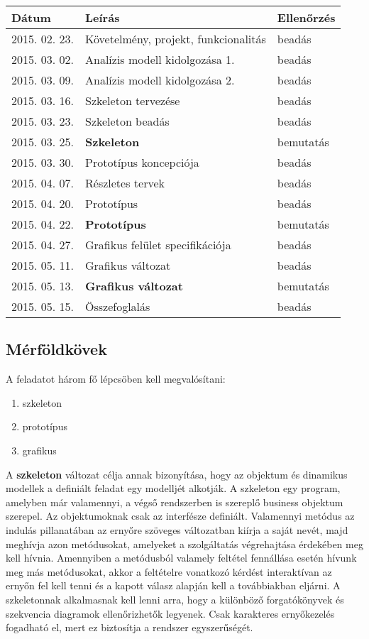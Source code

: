 \begin{tabularx}{\linewidth}{| l | l | l |}
\hline
\textbf{Dátum} & \textbf{Leírás} & \textbf{Ellenőrzés} \tabularnewline 
\hline \hline
\endhead
2015. 02. 23. & Követelmény, projekt, funkcionalitás & beadás \tabularnewline \hline
2015. 03. 02. & Analízis modell kidolgozása 1. & beadás \tabularnewline \hline
2015. 03. 09. & Analízis modell kidolgozása 2. & beadás \tabularnewline \hline
2015. 03. 16. & Szkeleton tervezése & beadás \tabularnewline \hline
2015. 03. 23. & Szkeleton beadás & beadás \tabularnewline \hline
2015. 03. 25. & \textbf{Szkeleton} & bemutatás \tabularnewline \hline
2015. 03. 30. & Prototípus koncepciója & beadás \tabularnewline \hline
2015. 04. 07. & Részletes tervek & beadás \tabularnewline \hline
2015. 04. 20. & Prototípus & beadás \tabularnewline \hline
2015. 04. 22. & \textbf{Prototípus} & bemutatás \tabularnewline \hline
2015. 04. 27. & Grafikus felület specifikációja & beadás \tabularnewline \hline
2015. 05. 11. & Grafikus változat & beadás \tabularnewline \hline
2015. 05. 13. & \textbf{Grafikus változat} & bemutatás \tabularnewline \hline
2015. 05. 15. & Összefoglalás & beadás \tabularnewline \hline
\end{tabularx}

\subsection{Mérföldkövek}
A feladatot három fő lépcsöben kell megvalósítani:
\begin{enumerate}
    \item szkeleton
    \item prototípus
    \item grafikus
\end{enumerate}

\noindent A \textbf{szkeleton} változat célja annak bizonyítása, hogy az objektum és dinamikus modellek a definiált feladat egy modelljét alkotják. A szkeleton egy program, amelyben már valamennyi, a végső rendszerben is szereplő business objektum szerepel. Az objektumoknak csak az interfésze definiált. Valamennyi metódus az indulás pillanatában az ernyőre szöveges változatban kiírja a saját nevét, majd meghívja azon metódusokat, amelyeket a szolgáltatás végrehajtása érdekében meg kell hívnia. Amennyiben
a metódusból valamely feltétel fennállása esetén hívunk meg más metódusokat, akkor a feltételre vonatkozó kérdést interaktívan az ernyőn fel kell tenni és a kapott válasz alapján kell a továbbiakban eljárni. A szkeletonnak alkalmasnak kell lenni arra, hogy a különböző forgatókönyvek és szekvencia diagramok ellenőrizhetők legyenek. Csak karakteres ernyőkezelés fogadható el, mert ez biztosítja a rendszer egyszerűségét. \\ 

